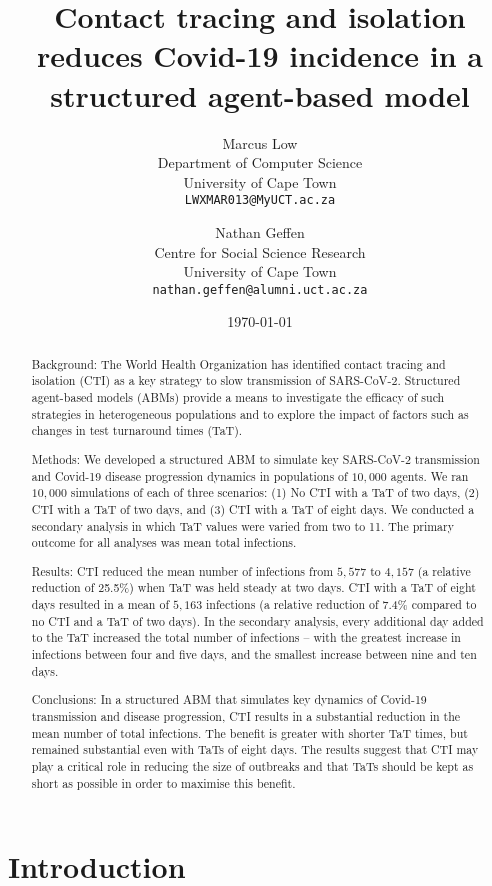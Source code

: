 \documentclass{article}
\title{Contact tracing and isolation reduces Covid-19 incidence in a structured agent-based model}
\author{
  Marcus Low \\
  Department of Computer Science \\
  University of Cape Town\\
  \texttt{LWXMAR013@MyUCT.ac.za} \\
  \and
  Nathan Geffen \\
  Centre for Social Science Research \\
  University of Cape Town\\
  \texttt{nathan.geffen@alumni.uct.ac.za}}
\date{\today}
\begin{document}
\maketitle

\begin{abstract}

Background: The World Health Organization has identified contact tracing and
isolation (CTI) as a key strategy to slow transmission of SARS-CoV-2. Structured
agent-based models (ABMs) provide a means to investigate the efficacy of such
strategies in heterogeneous populations and to explore the impact of factors
such as changes in test turnaround times (TaT).

Methods: We developed a structured ABM to simulate key SARS-CoV-2 transmission
and Covid-19 disease progression dynamics in populations of $10,000$ agents. We
ran $10,000$ simulations of each of three scenarios: (1) No CTI with a TaT of
two days, (2) CTI with a TaT of two days, and (3) CTI with a TaT of eight days. We
conducted a secondary analysis in which TaT values were varied from two to 11. The
primary outcome for all analyses was mean total infections.

Results: CTI reduced the mean number of infections from $5,577$ to $4,157$ (a
relative reduction of 25.5\%) when TaT was held steady at two days. CTI with a
TaT of eight days resulted in a mean of $5,163$ infections (a relative reduction
of 7.4\% compared to no CTI and a TaT of two days). In the secondary analysis,
every additional day added to the TaT increased the total number of infections –
with the greatest increase in infections between four and five days, and the
smallest increase between nine and ten days.

Conclusions: In a structured ABM that simulates key dynamics of Covid-19
transmission and disease progression, CTI results in a substantial reduction in
the mean number of total infections. The benefit is greater with shorter TaT
times, but remained substantial even with TaTs of eight days. The results
suggest that CTI may play a critical role in reducing the size of outbreaks and
that TaTs should be kept as short as possible in order to maximise this benefit.

\end{abstract}


\section{Introduction}
\end{document}
